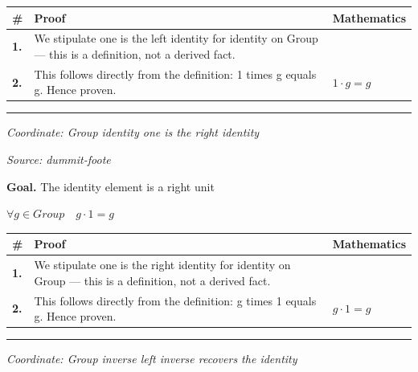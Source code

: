 \documentclass[11pt]{article}
\theoremstyle{definition}
\begin{document}
\medskip
\noindent
\begin{tabular}{@{} >{\raggedright\arraybackslash}p{} >{\raggedright\arraybackslash}p{} >{\raggedleft\arraybackslash}p{} @{}}
\textbf{\#} & \textbf{Proof} & \textbf{Mathematics} \\
\midrule
\textbf{1.} & We stipulate one is the left identity for identity on Group — this is a definition, not a derived fact. & \\[0.45em]
\textbf{2.} & This follows directly from the definition: 1 times g equals g. Hence proven. & $\displaystyle 1 \cdot g = g$ \\[0.45em]
\bottomrule
\end{tabular}
\label{thm:Group-identity-one_is_the_left_identity}
\par\medskip\hrule
\bigskip
{}\par
\smallskip\noindent\textit{Coordinate: Group \cdot identity \cdot one is the right identity}\par
\smallskip\noindent\textit{Source: dummit-foote}\par
\medskip
\noindent\textbf{Goal.} The identity element is a right unit\par
\noindent$\displaystyle \forall g \in Group\quad g \cdot 1 = g$\par
\medskip
\noindent
\begin{tabular}{@{} >{\raggedright\arraybackslash}p{} >{\raggedright\arraybackslash}p{} >{\raggedleft\arraybackslash}p{} @{}}
\textbf{\#} & \textbf{Proof} & \textbf{Mathematics} \\
\midrule
\textbf{1.} & We stipulate one is the right identity for identity on Group — this is a definition, not a derived fact. & \\[0.45em]
\textbf{2.} & This follows directly from the definition: g times 1 equals g. Hence proven. & $\displaystyle g \cdot 1 = g$ \\[0.45em]
\bottomrule
\end{tabular}
\label{thm:Group-identity-one_is_the_right_identity}
\par\medskip\hrule
\bigskip
{}\par
\smallskip\noindent\textit{Coordinate: Group \cdot inverse \cdot left inverse recovers the identity}\par
\end{document}
